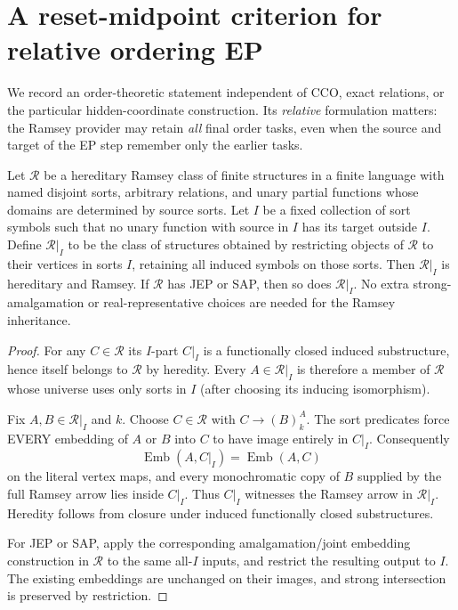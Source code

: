 \section{A reset-midpoint criterion for relative ordering EP}
\label{sec:reset-midpoint-ep}

We record an order-theoretic statement independent of CCO, exact
relations, or the particular hidden-coordinate construction.
Its \emph{relative} formulation matters: the Ramsey provider may
retain \emph{all} final order tasks, even when the source and
target of the EP step remember only the earlier tasks.

\begin{lemma}
\label{lem:foundational-ramsey-sort-restriction}
Let $\mathcal R$ be a hereditary Ramsey class
of finite structures in a finite language with
named disjoint sorts, arbitrary relations, and
unary partial functions whose domains are
determined by source sorts. Let $I$ be a fixed
collection of sort symbols such that no unary
function with source in $I$ has its target
outside $I$. Define $\mathcal R|_I$ to be
the class of structures obtained by restricting
objects of $\mathcal R$ to their vertices in
sorts $I$, retaining all induced symbols on
those sorts. Then $\mathcal R|_I$ is hereditary
and Ramsey. If $\mathcal R$ has JEP or SAP,
then so does $\mathcal R|_I$.
No extra strong-amalgamation or real-representative
choices are needed for the Ramsey inheritance.
\end{lemma}
\begin{proof}
For any $C\in\mathcal R$ its $I$-part
$C|_I$ is a functionally closed induced
substructure, hence itself belongs to
$\mathcal R$ by heredity. Every
$A\in\mathcal R|_I$ is therefore a
member of $\mathcal R$ whose universe
uses only sorts in $I$ (after choosing
its inducing isomorphism).

Fix $A,B\in\mathcal R|_I$ and $k$.
Choose $C\in\mathcal R$ with
$C\longrightarrow(B)^A_k$. The
sort predicates force EVERY embedding
of $A$ or $B$ into $C$ to have image
entirely in $C|_I$. Consequently
\[
 \operatorname{Emb}(A,C|_I)
         =\operatorname{Emb}(A,C)
\]
on the literal vertex maps, and every
monochromatic copy of $B$ supplied by
the full Ramsey arrow lies inside
$C|_I$. Thus $C|_I$ witnesses the
Ramsey arrow in $\mathcal R|_I$.
Heredity follows from closure under
induced functionally closed substructures.

For JEP or SAP, apply the corresponding
amalgamation/joint embedding construction
in $\mathcal R$ to the same all-$I$
inputs, and restrict the resulting output
to $I$. The existing embeddings are
unchanged on their images, and strong
intersection is preserved by restriction.
\end{proof}

